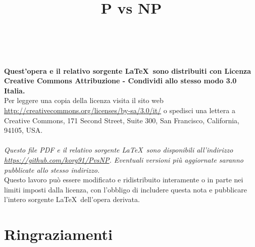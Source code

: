 \documentclass[12pt,a4paper]{report}
\theoremstyle{definition}
\begin{document}
          
          

\title{P vs NP}
\providecommand{\autore}{\large{Andrea Gadotti}}
\providecommand{\principaladvisor}{\large{Prof. Stefano Baratella}}
\providecommand{\firstreader}{\large{nessuno}}
\providecommand{\annoacc}{\large\textbf{2012 - 2013}}

\titlep


\null
\vfill
\noindent \ccbysa  \\
\\
\textbf{Quest'opera e il relativo sorgente \LaTeX \ sono distribuiti con Licenza Creative Commons Attribuzione - Condividi allo stesso modo 3.0 Italia.} \\
Per leggere una copia della licenza visita il sito web \url{http://creativecommons.org/licenses/by-sa/3.0/it/} o spedisci una lettera a Creative Commons, 171 Second
Street, Suite 300, San Francisco, California, 94105, USA.\\
\\
\emph{Questo file PDF e il relativo sorgente \LaTeX \ sono disponibili all'indirizzo\\
\emph{\url{https://github.com/korg91/PvsNP}}. Eventuali versioni più aggiornate saranno pubblicate allo stesso indirizzo.}\\
Questo lavoro può essere modificato e ridistribuito interamente o in parte nei limiti imposti dalla licenza, con l'obbligo di includere questa nota e pubblicare l'intero sorgente \LaTeX \ dell'opera derivata.



\newpage

\chapter*{Ringraziamenti}
\end{document}
